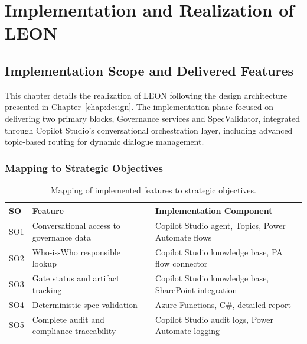 ﻿%

\chapter{Implementation and Realization of LEON}
\label{chap:implementation}

\section{\textcolor[HTML]{0066CC}{Implementation Scope and Delivered Features}}
\label{sec:impl-scope}

This chapter details the realization of LEON following the design architecture presented in Chapter~\ref{chap:design}. The implementation phase focused on delivering two primary blocks, Governance services and SpecValidator, integrated through Copilot Studio's conversational orchestration layer, including advanced topic-based routing for dynamic dialogue management.

\subsection{\textcolor[HTML]{003D99}{Mapping to Strategic Objectives}}

\begin{table}[H]
    \centering
    \small
    \caption{Mapping of implemented features to strategic objectives.}
    \label{tab:impl-so-mapping}
    \begin{tabularx}{\textwidth}{|l|l|X|}
        \hline
        \textbf{SO} & \textbf{Feature} & \textbf{Implementation Component} \\
        \hline
        SO1 & Conversational access to governance data & Copilot Studio agent, Topics, Power Automate flows \\
        \hline
        SO2 & Who-is-Who responsible lookup & Copilot Studio knowledge base, PA flow connector \\
        \hline
        SO3 & Gate status and artifact tracking & Copilot Studio knowledge base, SharePoint integration \\
        \hline
        SO4 & Deterministic spec validation & Azure Functions, C\#, detailed report \\
        \hline
        SO5 & Complete audit and compliance traceability & Copilot Studio audit logs, Power Automate logging \\
        \hline
    \end{tabularx}
\end{table}

